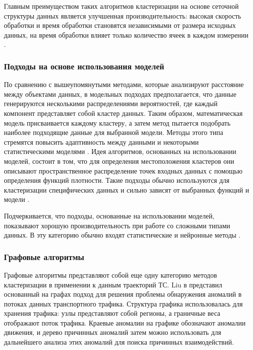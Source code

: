 Главным преимуществом таких алгоритмов кластеризации на основе сеточной структуры данных является улучшенная производительность: высокая скорость обработки и время обработки становятся независимыми от размера исходных данных, на время обработки влияет только количество ячеек в каждом измерении \cite{article:8_review_mot_cl_alg}.

\subsubsection{Подходы на основе использования моделей}

По сравнению с вышеупомянутыми методами, которые анализируют расстояние между объектами данных, в модельных подходах предполагается, что данные генерируются несколькими распределениями вероятностей, где каждый компонент представляет собой кластер данных. Таким образом, математическая модель присваивается каждому кластеру, а затем метод пытается подобрать наиболее подходящие данные для выбранной модели. Методы этого типа стремятся повысить адаптивность между данными и некоторыми статистическими моделями \cite{article:8_review_mot_cl_alg}\cite{article:22_survey_dscc}. Идея алгоритмов, основанных на использовании моделей, состоит в том, что для определения местоположения кластеров они описывают пространственное распределение точек входных данных с помощью определения функций плотности. Такие подходы обычно используются для кластеризации специфических данных и сильно зависят от выбранных функций и модели \cite{article:5_survey_tbsa}.

Подчеркивается, что подходы, основанные на использовании моделей, показывают хорошую производительность при работе со сложными типами данных. В эту категорию обычно входят статистические и нейронные методы \cite{article:8_review_mot_cl_alg}.

\subsubsection{Графовые алгоритмы \cite{article:1_survey_stdm}}

Графовые алгоритмы представляют собой еще одну категорию методов кластеризации в применении к данным траекторий ТС. Liu в \cite{inproceedings:26_dstci_tds} представил основанный на графах подход для решения проблемы обнаружения аномалий в потоках данных транспортного трафика. Структура графика использовалась для хранения трафика: узлы представляют собой регионы, а граничные веса отображают поток трафика. Краевые аномалии на графике обозначают аномалии движения, и дерево причинных аномалий затем можно использовать для дальнейшего анализа этих аномалий для поиска причинных взаимодействий.

